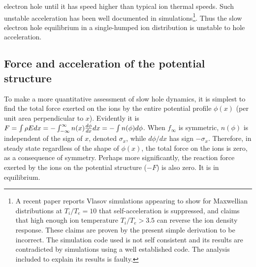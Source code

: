 \documentclass[12pt]{article}
\begin{document}
electron hole until it has speed higher than typical ion thermal
speeds. Such unstable acceleration has been well documented in
simulations\cite{Eliasson2004,Zhou2016}\footnote{A recent
  paper reports Vlasov simulations
  appearing to show for Maxwellian distributions at $T_i/T_e=10$ that
  self-acceleration is suppressed, and claims that high enough ion
  temperature $T_i/T_e>3.5$ can reverse the ion density
  response. These claims are proven by the present simple derivation
  to be incorrect.  The simulation code used is not self consistent
  and its results are contradicted by simulations using a well
  established code. The analysis included to explain its results is
  faulty.}.  Thus the slow electron hole equilibrium in a
single-humped ion distribution is unstable to hole acceleration.

\subsection{Force and acceleration of the potential structure}

To make a more quantitative assessment of slow hole dynamics, it is
simplest to find the total force exerted on the ions by the entire
potential profile $\phi(x)$ (per unit area perpendicular to
$x$). Evidently it is
$F=\int \rho Edx=-\int_{-\infty}^{\infty} n(x) {d\phi\over dx}dx
=-\int n(\phi) d\phi$. When $f_\infty$ is symmetric, $n(\phi)$ is
independent of the sign of $x$, denoted $\sigma_x$, while $d\phi/dx$ has sign
$-\sigma_x$. Therefore, in steady state regardless of the shape of
$\phi(x)$, the total force on the ions is zero, as a consequence of
symmetry. Perhaps more significantly, the reaction force exerted by
the ions on the potential structure ($-F$) is also zero. It is in
equilibrium.
\end{document}
